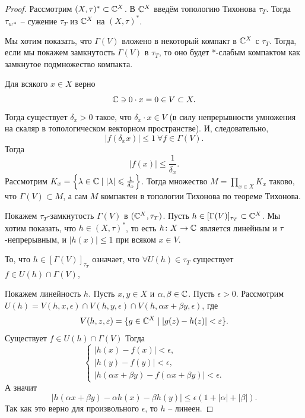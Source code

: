 \begin{proof}
    Рассмотрим $(X, \tau)^* \subset \mathbb{C}^{X}$.
    В $\mathbb{C}^X$ введём топологию Тихонова $\tau_T$.
    Тогда $\tau_{w*}$ -- сужение $\tau_T$ из $\mathbb{C}^X$ на $(X, \tau)^*$.

    Мы хотим показать, что $\Gamma(V)$ вложено в некоторый компакт в $\mathbb{C}^X$ с $\tau_T$.
    Тогда, если мы покажем замкнутость $\Gamma(V)$ в $\tau_T$, то оно будет *-слабым компактом как замкнутое подмножество компакта.

    Для всякого $x \in X$ верно
    \[
        \mathbb{C} \ni 0 \cdot x = 0 \in V \subset X.
    \]
    Тогда существует $\delta_x > 0$ такое, что $\delta_x \cdot x \in V$ (в силу непрерывности умножения на скаляр в топологическом векторном пространстве).
    И, следовательно,
    \[
        |f(\delta_x x)| \leq 1 \ \forall f \in \Gamma(V).
    \]
    Тогда
    \[
        |f(x)| \leq \frac{1}{\delta_x}.
    \]
    Рассмотрим $K_x = \left\{\lambda \in \mathbb{C} \mid |\lambda| \leqslant \frac{1}{\delta_x}\right\}$.
    Тогда множество $M = \prod_{x \in X} K_x$ таково, что $\Gamma(V) \subset M$, а сам $M$ компактен в топологии Тихонова по теореме Тихонова.

    Покажем $\tau_T$-замкнутость $\Gamma(V)$ в $(\mathbb{C}^X, \tau_T)$.
    Пусть $h \in [\Gamma(V)]_{\tau_T} \subset \mathbb{C}^{X}$.
    Мы хотим показать, что $h \in (X, \tau)^*$, то есть $h\colon X \to \mathbb{C}$ является линейным и $\tau$-непрерывным, и $|h(x)| \leq 1$ при всяком $x \in V$.

    То, что $h \in [\Gamma(V)]_{\tau_T}$ означает, что $\forall U(h) \in \tau_T$ существует $f \in U(h) \cap \Gamma(V)$,

    Покажем линейность $h$.
    Пусть $x, y \in X$ и $\alpha, \beta \in \mathbb{C}$.
    Пусть $\epsilon > 0$.
    Рассмотрим $U(h) = V(h, x, \epsilon) \cap V(h, y, \epsilon) \cap V(h, \alpha x + \beta y, \epsilon)$,
    где
    \[
        V(h, z, \varepsilon) = \{g \in \mathbb{C}^X \mid |g(z) - h(z)| < \varepsilon\}.
    \]
    Существует $f \in U(h) \cap \Gamma(V)$
    Тогда
    \[
        \begin{cases}
            |h(x) - f(x)| < \epsilon, \\
            |h(y) - f(y)| < \epsilon, \\
            |h(\alpha x + \beta y) - f(\alpha x + \beta y)| < \epsilon.
        \end{cases}
    \]
    А значит
    \[
        |h(\alpha x + \beta y) - \alpha h(x) - \beta h(y)| \leq \epsilon(1 + |\alpha| + |\beta|).
    \]
    Так как это верно для произвольного $\epsilon$, то $h$ -- линеен.


\end{proof}
